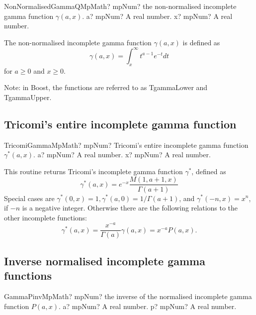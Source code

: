 \vspace{0.6cm}
\begin{mpFunctionsExtract}
	\mpFunctionTwoNotImplemented
	{NonNormalisedGammaQMpMath? mpNum? the non-normalised incomplete gamma function $\gamma(a,x)$.}
	{a? mpNum? A real number.}
	{x? mpNum? A real number.}
\end{mpFunctionsExtract}

\vspace{0.3cm}
The non-normalised incomplete gamma function $\gamma(a,x)$ is defined as
\begin{equation}
\gamma(a,x)= \int_x^{\infty} t^{a-1} e^{-t}dt
\end{equation}
for $a \geq 0$ and $x \geq 0$.


Note: in Boost, the functions are referred to as TgammaLower and TgammaUpper.


\subsection{Tricomi's entire incomplete gamma function}
\begin{mpFunctionsExtract}
	\mpFunctionTwoNotImplemented
	{TricomiGammaMpMath? mpNum? Tricomi's entire incomplete gamma function $\gamma^*(a,x)$.}
	{a? mpNum? A real number.}
	{x? mpNum? A real number.}
\end{mpFunctionsExtract}

\vspace{0.3cm}
This routine returns Tricomi's incomplete gamma function $\gamma^*$, defined as
\begin{equation}
\gamma^*(a,x)=e^{-x} \frac{M(1,a+1,x)}{\Gamma(a+1)}
\end{equation}
Special cases are $\gamma^*(0,x)=1, \gamma^*(a,0)=1/\Gamma(a+1)$, and $\gamma^*(-n,x)=x^n$, if $-n$ is a negative integer. Otherwise there are the following relations to the other incomplete functions:
\begin{equation}
\gamma^*(a,x)=\frac{x^{-a}}{\Gamma(a)}\gamma(a,x)=x^{-a} P(a,x).
\end{equation}


\subsection{Inverse normalised incomplete gamma functions}

\begin{mpFunctionsExtract}
	\mpFunctionTwoNotImplemented
	{GammaPinvMpMath? mpNum? the inverse of the normalised incomplete gamma function $P(a,x)$.}
	{a? mpNum? A real number.}
	{p? mpNum? A real number.}
\end{mpFunctionsExtract}

